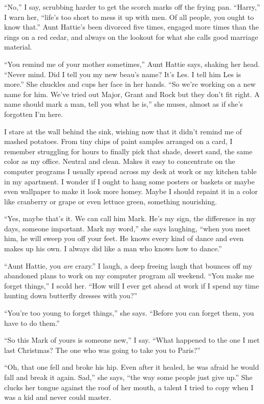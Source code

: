 \documentclass[twoside,10pt]{book}
\begin{document}
``No,'' I say, scrubbing harder to get the scorch marks off the frying
pan. ``Harry,'' I warn her, ``life's too short to mess it up with men.
Of all people, you ought to know that.'' Aunt Hattie's been divorced
five times, engaged more times than the rings on a red cedar, and always
on the lookout for what she calls good marriage material.

``You remind me of your mother sometimes,'' Aunt Hattie says, shaking
her head. ``Never mind. Did I tell you my new beau's name? It's Les. I
tell him Les is more.'' She chuckles and cups her face in her hands.
``So we're working on a new name for him. We've tried out Major, Grant
and Rock but they don't fit right. A name should mark a man, tell you
what he is,'' she muses, almost as if she's forgotten I'm here.

I stare at the wall behind the sink, wishing now that it didn't remind
me of mashed potatoes. From tiny chips of paint samples arranged on a
card, I remember struggling for hours to finally pick that shade, desert
sand, the same color as my office. Neutral and clean. Makes it easy to
concentrate on the computer programs I usually spread across my desk at
work or my kitchen table in my apart­ment. I wonder if I ought to hang
some posters or baskets or maybe even wallpaper to make it look more
homey. Maybe I should repaint it in a color like cranberry or grape or
even lettuce green, some­thing nourishing.

``Yes, maybe that's it. We can call him Mark. He's my sign, the
difference in my days, some­one important. Mark my word,'' she says
laughing, ``when you meet him, he will sweep you off your feet. He knows
every kind of dance and even makes up his own. I always did like a man
who knows how to dance.''

``Aunt Hattie, you \emph{are} crazy.'' I laugh, a deep freeing laugh
that bounces off my abandoned plans to work on my computer program all
weekend. ``You make me forget things,'' I scold her. ``How will I ever
get ahead at work if I spend my time hunting down butterfly dresses with
you?''

``You're too young to forget things,'' she says. ``Before you can forget
them, you have to do them.''

``So this Mark of yours is someone new,'' I say. ``What happened to the
one I met last Christ­mas? The one who was going to take you to Paris?''

``Oh, that one fell and broke his hip. Even after it healed, he was
afraid he would fall and break it again. Sad,'' she says, ``the way some
people just give up.'' She clucks her tongue against the roof of her
mouth, a talent I tried to copy when I was a kid and never could master.
\end{document}
